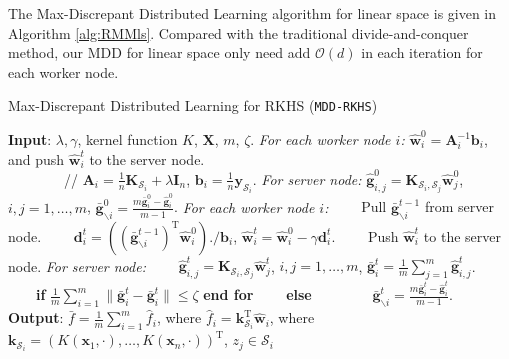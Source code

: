 \documentclass{article}
\begin{document}
The Max-Discrepant Distributed Learning  algorithm for linear space is given in Algorithm \ref{alg:RMMls}.
Compared with the traditional divide-and-conquer method,
our MDD for linear space only need add $\mathcal{O}(d)$ in each iteration for each worker node.
\begin{algorithm}
    \caption{Max-Discrepant Distributed Learning for RKHS (\texttt{MDD-RKHS})}
    \label{alg:RMMRKHS}
    \begin{algorithmic}[1]
    \STATE \textbf{Input}: $\lambda,\gamma$, kernel function $K$, $\mathbf X$, $m$, $\zeta$.
     \STATE \emph{For each worker node $i$:} $\hat{\mathbf w}_i^0=\mathbf A_i^{-1} \mathbf b_i$, and push $\hat{\mathbf w}_i^t$ to the server node.\\
            ~~~~~~~~// $\mathbf A_i=\frac{1}{n}\mathbf K_{\mathcal{S}_i}+
            \lambda \mathbf I_n$, $\mathbf b_i= \frac{1}{n}\mathbf y_{\mathcal{S}_i}$.
    \STATE \emph{For server node:} $\hat{\mathbf g}_{i,j}^0=\mathbf K_{\mathcal{S}_i,\mathcal{S}_j}\hat{\mathbf w}_j^0$, $i, j=1,\ldots,m$, $\bar{\mathbf g}^{0}_{\backslash i}=\frac{m\bar{\mathbf g}_i^{0}-\hat{\mathbf g}_i^0}{m-1}$.
    \STATE  \emph{For each worker node $i$:}
    \STATE ~~~~Pull $\bar{\mathbf g}^{t-1}_{\backslash i}$ from server node.
    \STATE ~~~~$\mathbf d_i^t=\left(\left(\bar{\mathbf g}^{t-1}_{\backslash i}\right)^\mathrm{T}\hat{\mathbf w}_i^0\right)./\mathbf b_i$,
     $\hat{\mathbf w}_i^t=\hat{\mathbf w}_i^0-\gamma\mathbf d_i^t$.
    \STATE ~~~~Push $\hat{\mathbf w}_i^t$ to the server node.
     \STATE \emph{For server node:}
     \STATE ~~~~$\hat{\mathbf g}_{i,j}^{t}=\mathbf K_{\mathcal{S}_i,\mathcal{S}_j}\hat{\mathbf w}_j^t$, $i, j=1,\ldots,m$,
     $\bar{\mathbf g}_{i}^t=\frac{1}{m}\sum_{j=1}^m \hat{\mathbf g}_{i,j}^t$.\\
      ~~~~\textbf{if} {$\frac{1}{m}\sum_{i=1}^m\|\bar{\mathbf g}_i^{t}-\bar{\mathbf g}_i^{t}\|\leq \zeta$} \textbf{end for}
      \STATE ~~~~\textbf{else}
      \STATE ~~~~~~~~$\bar{\mathbf g}^{t}_{\backslash i}=\frac{m\bar{\mathbf g}_i^{t}-\hat{\mathbf g}_i^t}{m-1}$.
    \ENDFOR
    \STATE \textbf{Output}: $\bar{f}=\frac{1}{m}\sum_{i=1}^m\hat{f}_i$, where $\hat{f}_i=\mathbf k_{\mathcal{S}_i}^\mathrm{T}\hat{\mathbf w}_i$,
    where $\mathbf k_{\mathcal{S}_i}=(K(\mathbf x_1,\cdot),\ldots,K(\mathbf x_n,\cdot))^\mathrm{T}$, $z_j\in\mathcal{S}_i$
    \end{algorithmic}
\end{algorithm}
\end{document}
